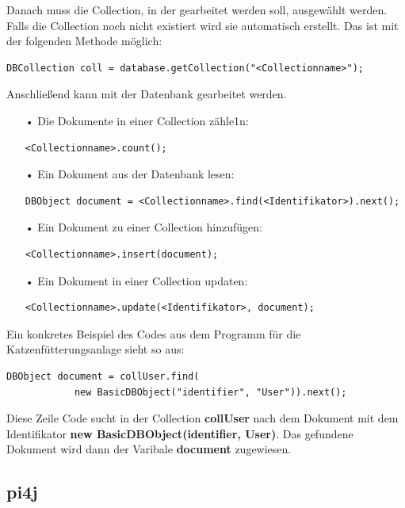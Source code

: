 Danach muss die Collection, in der gearbeitet werden soll, ausgewählt werden. Falls die Collection noch nicht existiert wird sie automatisch erstellt. Das ist mit der folgenden Methode möglich:
\begin{lstlisting}[style=JavaStyle]
	DBCollection coll = database.getCollection("<Collectionname>");
\end{lstlisting}
Anschließend kann mit der Datenbank gearbeitet werden. 
\begin{itemize}
\item[•] Die Dokumente in einer Collection zähle1n:
\begin{lstlisting}[style=JavaStyle]
	<Collectionname>.count();
\end{lstlisting}
\item[•] Ein Dokument aus der Datenbank lesen:
\begin{lstlisting}[style=JavaStyle]
	DBObject document = <Collectionname>.find(<Identifikator>).next();
\end{lstlisting}
\item[•] Ein Dokument zu einer Collection hinzufügen:
\begin{lstlisting}[style=JavaStyle]
	<Collectionname>.insert(document);
\end{lstlisting}	
\item[•] Ein Dokument in einer Collection updaten:
\begin{lstlisting}[style=JavaStyle]
	<Collectionname>.update(<Identifikator>, document);
\end{lstlisting}
\end{itemize}

\newpage

Ein konkretes Beispiel des Codes aus dem Programm für die Katzenfütterungsanlage sieht so aus:
\begin{lstlisting}[style=JavaStyle]
	DBObject document = collUser.find(
			new BasicDBObject("identifier", "User")).next();
\end{lstlisting}
Diese Zeile Code sucht in der Collection \textbf{collUser} nach dem Dokument mit dem Identifikator \textbf{new BasicDBObject(\grqq{}identifier\grqq{}, \grqq{}User\grqq{})}. Das gefundene Dokument wird dann der Varibale \textbf{document} zugewiesen. 


\subsection{pi4j}
